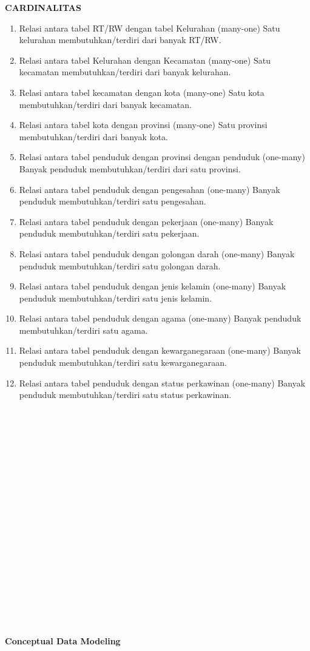\documentclass[12pt,a4paper,bahasa]{article}
\begin{document}
\textbf{CARDINALITAS}
\begin{enumerate}
\item Relasi antara tabel RT/RW dengan tabel Kelurahan (many-one)
Satu kelurahan membutuhkan/terdiri dari banyak RT/RW. 
\item Relasi antara tabel Kelurahan dengan Kecamatan (many-one)
Satu kecamatan membutuhkan/terdiri dari banyak kelurahan. 
\item Relasi antara tabel kecamatan dengan kota (many-one)
Satu kota membutuhkan/terdiri dari banyak kecamatan.
\item Relasi antara tabel kota dengan provinsi (many-one)
Satu provinsi membutuhkan/terdiri dari banyak kota.
\item Relasi antara tabel penduduk dengan provinsi dengan penduduk (one-many)
Banyak penduduk membutuhkan/terdiri dari satu provinsi.
\item Relasi antara tabel penduduk dengan pengesahan  (one-many)
Banyak penduduk membutuhkan/terdiri satu pengesahan.
\item Relasi antara tabel penduduk dengan pekerjaan (one-many)
Banyak penduduk membutuhkan/terdiri satu pekerjaan.
\item Relasi antara tabel penduduk dengan golongan darah (one-many)
Banyak penduduk membutuhkan/terdiri satu golongan darah.
\item Relasi antara tabel penduduk dengan jenis kelamin (one-many)
Banyak penduduk membutuhkan/terdiri satu jenis kelamin.
\item Relasi antara tabel penduduk dengan agama (one-many)
Banyak penduduk membutuhkan/terdiri satu agama.
\item Relasi antara tabel penduduk dengan kewarganegaraan (one-many)
Banyak penduduk membutuhkan/terdiri satu kewarganegaraan.
\item Relasi antara tabel penduduk dengan status perkawinan (one-many)
Banyak penduduk membutuhkan/terdiri satu status perkawinan.
\\\\\\\\
\\\\\\\\
\\\\\\\\
\\\\\\\\
\\\\\\\\
\end{enumerate}
\textbf{Conceptual  Data Modeling}
\end{document}

